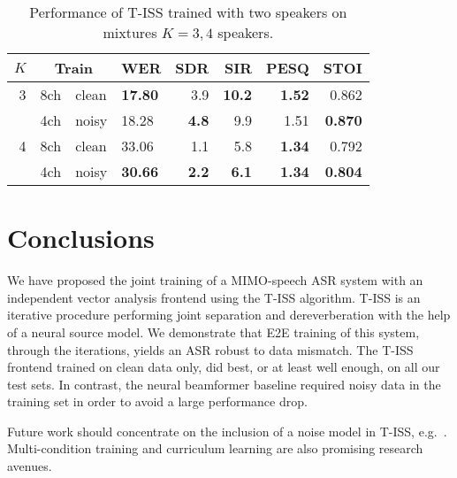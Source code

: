 \documentclass[a4paper]{article}
\begin{document}
\begin{table}
  \centering
  \caption{Performance of T-ISS trained with two speakers on mixtures $K=3,4$ speakers.}
  \footnotesize
  \begin{tabular}{@{}rl@{~/~}llrrrr@{}}
    \toprule
    $K$ & \multicolumn{2}{c}{Train}   & WER    &   SDR &   SIR &   PESQ &   STOI \\
    \midrule
          3 & 8ch & clean        &  \bf   17.80 &     3.9 & \bf 10.2 & \bf 1.52 &      0.862   \\
            & 4ch & noisy        &        18.28 & \bf 4.8 &      9.9 &     1.51 &  \bf 0.870 \\
                    \cmidrule{1-8}
          4 & 8ch & clean        &        33.06 &     1.1 &      5.8 & \bf 1.34 &     0.792 \\
            & 4ch & noisy        &  \bf   30.66 & \bf 2.2 &  \bf 6.1 & \bf 1.34 & \bf 0.804 \\
    \bottomrule
  \end{tabular}
  
\end{table}

\section{Conclusions}

We have proposed the joint training of a MIMO-speech ASR system with an independent vector analysis frontend using the T-ISS algorithm.
T-ISS is an iterative procedure performing joint separation and dereverberation with the help of a neural source model.
We demonstrate that E2E training of this system, through the iterations, yields an ASR robust to data mismatch.
The T-ISS frontend trained on clean data only, did best, or at least well enough, on all our test sets.
In contrast, the neural beamformer baseline required noisy data in the training set in order to avoid a large performance drop.

Future work should concentrate on the inclusion of a noise model in T-ISS, e.g.~\cite{koldovskyOrthogonallyConstrainedExtractionIndependent2018}.
Multi-condition training and curriculum learning are also promising research avenues.

\clearpage




\end{document}
